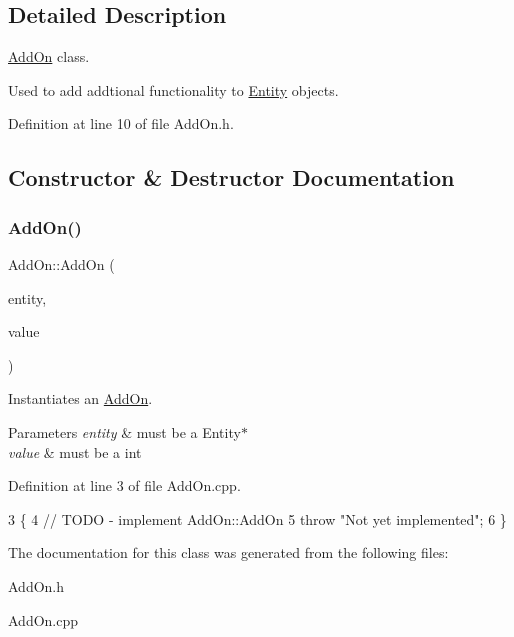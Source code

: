 \subsection{Detailed Description}
\hyperlink{classAddOn}{Add\+On} class. 

Used to add addtional functionality to \hyperlink{classEntity}{Entity} objects. 

Definition at line 10 of file Add\+On.\+h.



\subsection{Constructor \& Destructor Documentation}
\mbox{\label{classAddOn_abb1bfa4bf3040a25a5933ad956c165c9}} 
\subsubsection{\texorpdfstring{Add\+On()}{AddOn()}}
{\footnotesize\ttfamily Add\+On\+::\+Add\+On (\begin{DoxyParamCaption}\item[{\hyperlink{classEntity}{Entity} $\ast$}]{entity,  }\item[{int}]{value }\end{DoxyParamCaption})}



Instantiates an \hyperlink{classAddOn}{Add\+On}. 


\begin{DoxyParams}{Parameters}
{\em entity} & must be a Entity$\ast$ \\
\hline
{\em value} & must be a int \\
\hline
\end{DoxyParams}


Definition at line 3 of file Add\+On.\+cpp.


\begin{DoxyCode}
3                                       \{
4     \textcolor{comment}{// TODO - implement AddOn::AddOn}
5     \textcolor{keywordflow}{throw} \textcolor{stringliteral}{"Not yet implemented"};
6 \}
\end{DoxyCode}


The documentation for this class was generated from the following files\+:\begin{DoxyCompactItemize}
\item 
Add\+On.\+h\item 
Add\+On.\+cpp\end{DoxyCompactItemize}
